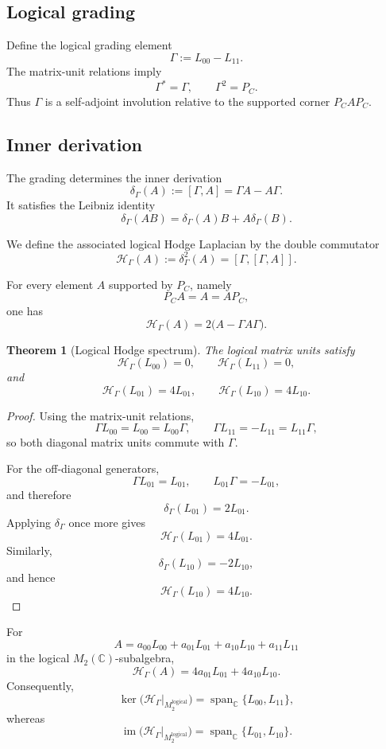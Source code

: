 \documentclass[11pt,a4paper]{article}
\newtheorem{theorem}{Theorem}[section]
\begin{document}
\subsection{Logical grading}

Define the logical grading element
\[
\Gamma:=L_{00}-L_{11}.
\]
The matrix-unit relations imply
\[
\Gamma^{*}=\Gamma,
\qquad
\Gamma^{2}=P_C.
\]
Thus \(\Gamma\) is a self-adjoint involution relative to the supported
corner \(P_CAP_C\).

\subsection{Inner derivation}

The grading determines the inner derivation
\[
\delta_{\Gamma}(A)
:=
[\Gamma,A]
=
\Gamma A-A\Gamma.
\]
It satisfies the Leibniz identity
\[
\delta_{\Gamma}(AB)
=
\delta_{\Gamma}(A)B
+
A\delta_{\Gamma}(B).
\]

We define the associated logical Hodge Laplacian by the double
commutator
\[
\mathcal H_{\Gamma}(A)
:=
\delta_{\Gamma}^{2}(A)
=
[\Gamma,[\Gamma,A]].
\]

For every element \(A\) supported by \(P_C\), namely
\[
P_CA=A=AP_C,
\]
one has
\[
\mathcal H_{\Gamma}(A)
=
2\bigl(A-\Gamma A\Gamma\bigr).
\]

\begin{theorem}[Logical Hodge spectrum]
The logical matrix units satisfy
\[
\mathcal H_{\Gamma}(L_{00})=0,
\qquad
\mathcal H_{\Gamma}(L_{11})=0,
\]
and
\[
\mathcal H_{\Gamma}(L_{01})=4L_{01},
\qquad
\mathcal H_{\Gamma}(L_{10})=4L_{10}.
\]
\end{theorem}

\begin{proof}
Using the matrix-unit relations,
\[
\Gamma L_{00}=L_{00}=L_{00}\Gamma,
\qquad
\Gamma L_{11}=-L_{11}=L_{11}\Gamma,
\]
so both diagonal matrix units commute with \(\Gamma\).

For the off-diagonal generators,
\[
\Gamma L_{01}=L_{01},
\qquad
L_{01}\Gamma=-L_{01},
\]
and therefore
\[
\delta_{\Gamma}(L_{01})=2L_{01}.
\]
Applying \(\delta_{\Gamma}\) once more gives
\[
\mathcal H_{\Gamma}(L_{01})=4L_{01}.
\]
Similarly,
\[
\delta_{\Gamma}(L_{10})=-2L_{10},
\]
and hence
\[
\mathcal H_{\Gamma}(L_{10})=4L_{10}.
\]
\end{proof}

\begin{corollary}
For
\[
A=
a_{00}L_{00}
+a_{01}L_{01}
+a_{10}L_{10}
+a_{11}L_{11}
\]
in the logical \(M_2(\mathbb C)\)-subalgebra,
\[
\mathcal H_{\Gamma}(A)
=
4a_{01}L_{01}
+
4a_{10}L_{10}.
\]
Consequently,
\[
\ker
\bigl(
\mathcal H_{\Gamma}
\vert_{M_2^{\mathrm{logical}}}
\bigr)
=
\operatorname{span}_{\mathbb C}
\{L_{00},L_{11}\},
\]
whereas
\[
\operatorname{im}
\bigl(
\mathcal H_{\Gamma}
\vert_{M_2^{\mathrm{logical}}}
\bigr)
=
\operatorname{span}_{\mathbb C}
\{L_{01},L_{10}\}.
\]
\end{corollary}
\end{document}
